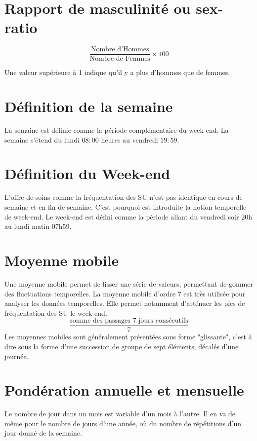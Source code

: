 \documentclass[12pt,english,french,twoside]{report}\usepackage[]{graphicx}\usepackage[]{color}
\begin{document}
\section*{Rapport de masculinité ou sex-ratio}
\begin{displaymath}
    \frac{\text{Nombre d'Hommes}}{\text{Nombre de Femmes}} \times 100
\end{displaymath}

Une valeur supérieure à 1 indique qu'il y a plus d'hommes que de femmes.

\section*{Définition de la semaine}
La semaine est définie comme la période complémentaire du week-end. La semaine s'étend du lundi $08:00$ heures au vendredi $19:59$.

\section*{Définition du Week-end}
L'offre de soins comme la fréquentation des SU n'est pas identique en cours de semaine et en fin de semaine. C'est pourquoi est introduite la notion temporelle de week-end.
Le week-end est défini comme la période allant du vendredi soir 20h au lundi matin 07h59.

\section*{Moyenne mobile}
Une moyenne mobile permet de lisser une série de valeurs, permettant de gommer des fluctuations temporelles. La moyenne mobile d'ordre $7$ est très utilisée pour analyser les données temporelles. Elle permet notamment d'atténuer les pics de fréquentation des SU le week-end.
\begin{displaymath}
    \frac{\text{somme des passages 7 jours consécutifs}}{7}
\end{displaymath}
Les moyennes mobiles sont généralement présentées sous forme "glissante", c'est à dire sous la forme d'une succession de groupe de sept éléments, décalés d'une journée.

\section*{Pondération annuelle et mensuelle}
Le nombre de jour dans un mois est variable d'un mois à l'autre. Il en va de même pour le nombre de jours d'une année, où du nombre de répétitions d'un jour donné de la semaine.
\end{document}
